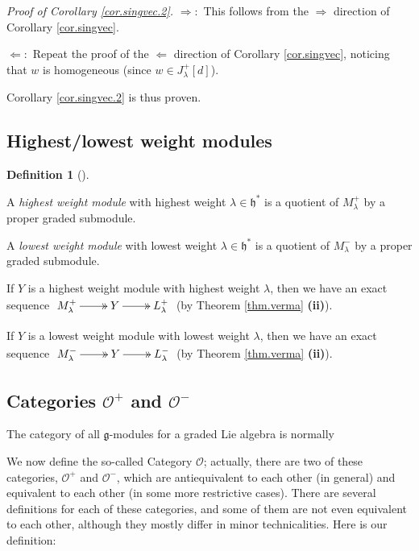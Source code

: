 \documentclass
[numbers=enddot,12pt,final,onecolumn,german,notitlepage]{scrartcl}%
\makeatletter
\newcommand{\arsurj}{\ar@{->>}}
\theoremstyle{definition}
\newtheorem{defi}[theo]{Definition}
\newenvironment{definition}[1][]
{\begin{defi}[#1]\begin{leftbar}}
{\end{leftbar}\end{defi}}
\makeatother
\begin{document}
\textit{Proof of Corollary \ref{cor.singvec.2}.} $\Longrightarrow:$ This
follows from the $\Longrightarrow$ direction of Corollary \ref{cor.singvec}.

$\Longleftarrow:$ Repeat the proof of the $\Longleftarrow$ direction of
Corollary \ref{cor.singvec}, noticing that $w$ is homogeneous (since $w\in
J_{\lambda}^{+}\left[  d\right]  $).

Corollary \ref{cor.singvec.2} is thus proven.

\subsection{Highest/lowest weight modules}

\begin{definition}
A \textit{highest weight module} with highest weight $\lambda\in
\mathfrak{h}^{\ast}$ is a quotient of $M_{\lambda}^{+}$ by a proper graded submodule.

A \textit{lowest weight module} with lowest weight $\lambda\in\mathfrak{h}%
^{\ast}$ is a quotient of $M_{\lambda}^{-}$ by a proper graded submodule.

If $Y$ is a highest weight module with highest weight $\lambda$, then we have
an exact sequence $%
\xymatrix{
M^{+}_{\lambda} \arsurj[r] & Y \arsurj[r] & L^{+}_{\lambda}
}%
$ (by Theorem \ref{thm.verma} \textbf{(ii)}).

If $Y$ is a lowest weight module with lowest weight $\lambda$, then we have an
exact sequence $%
\xymatrix{
M^{-}_{\lambda} \arsurj[r] & Y \arsurj[r] & L^{-}_{\lambda}
}%
$ (by Theorem \ref{thm.verma} \textbf{(ii)}).
\end{definition}

\subsection{Categories $\mathcal{O}^{+}$ and $\mathcal{O}^{-}$}

The category of all $\mathfrak{g}$-modules for a graded Lie algebra is normally

We now define the so-called Category $\mathcal{O}$; actually, there are two of
these categories, $\mathcal{O}^{+}$ and $\mathcal{O}^{-}$, which are
antiequivalent to each other (in general) and equivalent to each other (in
some more restrictive cases). There are several definitions for each of these
categories, and some of them are not even equivalent to each other, although
they mostly differ in minor technicalities. Here is our definition:
\end{document}

